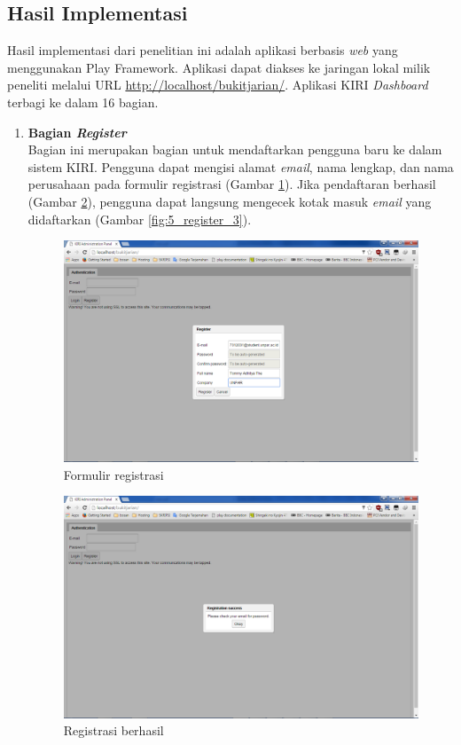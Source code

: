 \subsection{Hasil Implementasi}
\label{sec:hasilimplementasi}
Hasil implementasi dari penelitian ini adalah aplikasi berbasis \textit{web} yang menggunakan Play Framework. Aplikasi dapat diakses ke jaringan lokal milik peneliti melalui URL \url{http://localhost/bukitjarian/}. Aplikasi KIRI \textit{Dashboard} terbagi ke dalam 16 bagian.
\begin{enumerate}
	\item \textbf{Bagian \textit{Register}}\\
	Bagian ini merupakan bagian untuk mendaftarkan pengguna baru ke dalam sistem KIRI. Pengguna dapat mengisi alamat \textit{email}, nama lengkap, dan nama perusahaan pada formulir registrasi (Gambar \ref{fig:5_register_1}). Jika pendaftaran berhasil (Gambar \ref{fig:5_register_2}), pengguna dapat langsung mengecek kotak masuk \textit{email} yang didaftarkan (Gambar \ref{fig:5_register_3}).

	\begin{figure}[htbp]
		\centering
			\includegraphics[scale=0.45]{Gambar/5_register_1.png}
		\caption{Formulir registrasi}
		\label{fig:5_register_1}
	\end{figure}

	\begin{figure}[htbp]
		\centering
			\includegraphics[scale=0.45]{Gambar/5_register_2.png}
		\caption{Registrasi berhasil}
		\label{fig:5_register_2}
	\end{figure}


\end{enumerate}

